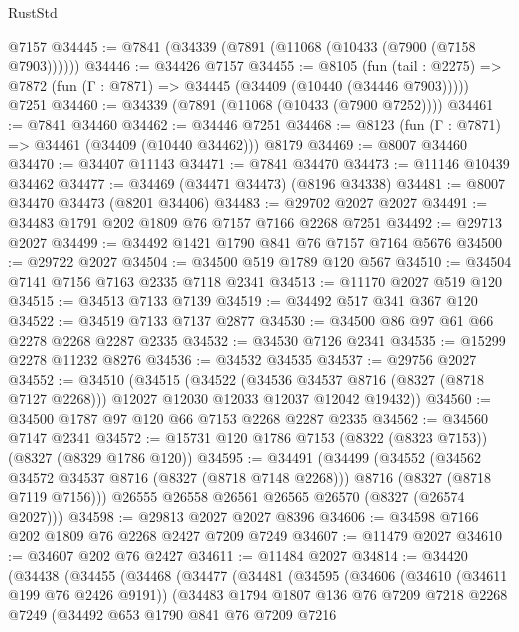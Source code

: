 \begin{lexlean}{RustStd}
\begin{coremodule}
{\begin{coremodule}
{{{{{{{{{{{{{{{{{{{{{{{{{{{{{{{{{{{{{{{{{{{{{{{{{{{{{{    @7157
@34445 := @7841 (@34339 (@7891 (@11068 (@10433 (@7900 (@7158 @7903))))))
@34446 := @34426 @7157
@34455 := @8105
    (fun (tail : @2275) => @7872 (fun (Γ : @7871) => @34445 (@34409 (@10440 (@34446 @7903)))))
    @7251
@34460 := @34339 (@7891 (@11068 (@10433 (@7900 @7252))))
@34461 := @7841 @34460
@34462 := @34446 @7251
@34468 := @8123 (fun (Γ : @7871) => @34461 (@34409 (@10440 @34462))) @8179
@34469 := @8007 @34460
@34470 := @34407 @11143
@34471 := @7841 @34470
@34473 := @11146 @10439 @34462
@34477 := @34469 (@34471 @34473) (@8196 @34338)
@34481 := @8007 @34470 @34473 (@8201 @34406)
@34483 := @29702 @2027 @2027
@34491 := @34483 @1791 @202 @1809 @76 @7157 @7166 @2268 @7251
@34492 := @29713 @2027
@34499 := @34492 @1421 @1790 @841 @76 @7157 @7164 @5676
@34500 := @29722 @2027
@34504 := @34500 @519 @1789 @120 @567
@34510 := @34504 @7141 @7156 @7163 @2335 @7118 @2341
@34513 := @11170 @2027 @519 @120
@34515 := @34513 @7133 @7139
@34519 := @34492 @517 @341 @367 @120
@34522 := @34519 @7133 @7137 @2877
@34530 := @34500 @86 @97 @61 @66 @2278 @2268 @2287 @2335
@34532 := @34530 @7126 @2341
@34535 := @15299 @2278 @11232 @8276
@34536 := @34532 @34535
@34537 := @29756 @2027
@34552 := @34510
    (@34515
      (@34522
        (@34536 @34537 @8716 (@8327 (@8718 @7127 @2268)))
        @12027
        @12030
        @12033
        @12037
        @12042
        @19432))
@34560 := @34500 @1787 @97 @120 @66 @7153 @2268 @2287 @2335
@34562 := @34560 @7147 @2341
@34572 := @15731 @120 @1786 @7153 (@8322 (@8323 @7153)) (@8327 (@8329 @1786 @120))
@34595 := @34491
    (@34499
      (@34552
        (@34562 @34572 @34537 @8716 (@8327 (@8718 @7148 @2268)))
        @8716
        (@8327 (@8718 @7119 @7156)))
      @26555
      @26558
      @26561
      @26565
      @26570
      (@8327 (@26574 @2027)))
@34598 := @29813 @2027 @2027 @8396
@34606 := @34598 @7166 @202 @1809 @76 @2268 @2427 @7209 @7249
@34607 := @11479 @2027
@34610 := @34607 @202 @76 @2427
@34611 := @11484 @2027
@34814 := @34420
    (@34438
      (@34455
        (@34468
          (@34477
            (@34481
              (@34595
                (@34606
                  (@34610 (@34611 @199 @76 @2426 @9191))
                  (@34483
                    @1794
                    @1807
                    @136
                    @76
                    @7209
                    @7218
                    @2268
                    @7249
                    (@34492
                      @653
                      @1790
                      @841
                      @76
                      @7209
                      @7216
}}}}}}}}}}}}}}}}}}}}}}}}}}}}}}}}}}}}}}}}}}}}}}}}}}}}}}
\end{coremodule}}
\end{coremodule}
\end{lexlean}
